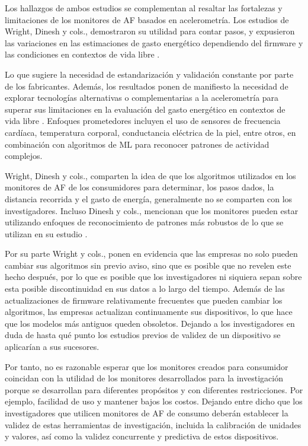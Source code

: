 Los hallazgos de ambos estudios se complementan al resaltar las fortalezas y limitaciones de los monitores de AF basados en acelerometría. Los estudios de Wright, Dinesh y cols., demostraron su utilidad para contar pasos, y expusieron las variaciones en las estimaciones de gasto energético dependiendo del firmware y las condiciones en contextos de vida libre \citep{Wright2017ConsumerMonitors,Dinesh2014ActiGraph}.

Lo que sugiere la necesidad de estandarización y validación constante por parte de los fabricantes. Además, los resultados ponen de manifiesto la necesidad de explorar tecnologías alternativas o complementarias a la acelerometría para superar sus limitaciones en la evaluación del gasto energético en contextos de vida libre \citep{Dinesh2014ActiGraph}. Enfoques prometedores incluyen el uso de sensores de frecuencia cardíaca, temperatura corporal, conductancia eléctrica de la piel, entre otros, en combinación con algoritmos de ML para reconocer patrones de actividad complejos.

Wright, Dinesh y cols., comparten la idea de que los algoritmos utilizados en los monitores de AF de los consumidores para determinar, los pasos dados, la distancia recorrida y el gasto de energía, generalmente no se comparten con los investigadores. Incluso Dinesh y cols., mencionan que los monitores pueden estar utilizando enfoques de reconocimiento de patrones más robustos de lo que se utilizan en su estudio \citep{Wright2017ConsumerMonitors,Dinesh2014ActiGraph}.

Por su parte Wright y cols., ponen en evidencia que las empresas no solo pueden cambiar sus algoritmos sin previo aviso, sino que es posible que no revelen este hecho después, por lo que es posible que los investigadores ni siquiera sepan sobre esta posible discontinuidad en sus datos a lo largo del tiempo. Además de las actualizaciones de firmware relativamente frecuentes que pueden cambiar los algoritmos, las empresas actualizan continuamente sus dispositivos, lo que hace que los modelos más antiguos queden obsoletos. Dejando a los investigadores en duda de hasta qué punto los estudios previos de validez de un dispositivo se aplicarían a sus sucesores.

Por tanto, no es razonable esperar que los monitores creados para consumidor coincidan con la utilidad de los monitores desarrollados para la investigación porque se desarrollan para diferentes propósitos y con diferentes restricciones. Por ejemplo, facilidad de uso y mantener bajos los costos. Dejando entre dicho que los investigadores que utilicen monitores de AF de consumo deberán establecer la validez de estas herramientas de investigación, incluida la calibración de unidades y valores, así como la validez concurrente y predictiva de estos dispositivos.

